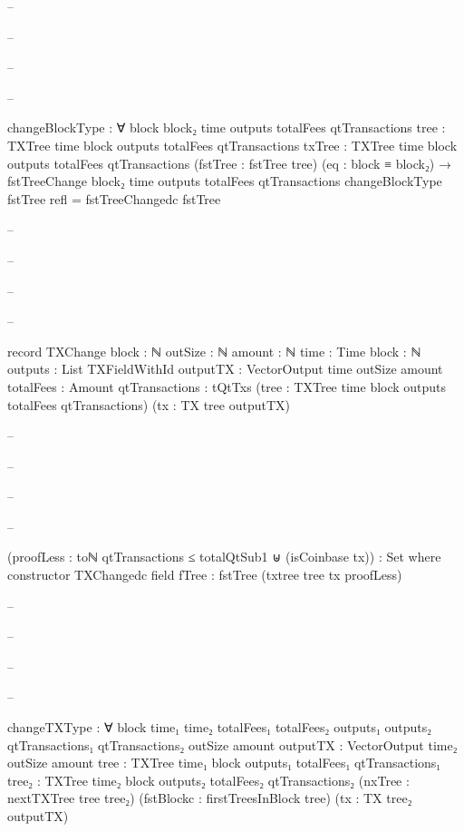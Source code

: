 \documentclass{beamer}
\begin{document}
{\begin{frame}
\begin{code}
-- \end{code}
-- \end{frame}
-- \begin{frame}
-- \begin{code}

      changeBlockType : ∀
        {block block₂ time outputs totalFees qtTransactions}
        {tree : TXTree time block outputs totalFees qtTransactions}
        {txTree : TXTree time block outputs
          totalFees qtTransactions}
        (fstTree : fstTree tree)
        (eq : block ≡ block₂)
        → fstTreeChange block₂ time outputs
          totalFees qtTransactions
      changeBlockType fstTree refl = fstTreeChangedc fstTree

-- \end{code}
-- \end{frame}
-- \begin{frame}
-- \begin{code}

      record TXChange
        {block : ℕ}
        {outSize : ℕ}
        {amount : ℕ}
        {time : Time}
        {block : ℕ}
        {outputs : List TXFieldWithId}
        {outputTX : VectorOutput time outSize amount}
        {totalFees : Amount}
        {qtTransactions : tQtTxs}
        (tree : TXTree time block outputs totalFees qtTransactions)
        (tx : TX tree outputTX)

-- \end{code}
-- \end{frame}
-- \begin{frame}
-- \begin{code}

        (proofLess :
          toℕ qtTransactions ≤ totalQtSub1
          ⊎
          (isCoinbase tx))
        : Set where
        constructor TXChangedc
        field
          fTree                 : fstTree (txtree tree tx proofLess)

-- \end{code}
-- \end{frame}
-- \begin{frame}
-- \begin{code}


      changeTXType : ∀
        {block time₁ time₂ totalFees₁ totalFees₂
          outputs₁ outputs₂ qtTransactions₁ qtTransactions₂
        outSize amount}
        {outputTX : VectorOutput time₂ outSize amount}
        {tree : TXTree time₁ block
          outputs₁ totalFees₁ qtTransactions₁}
        {tree₂ : TXTree time₂ block outputs₂
          totalFees₂ qtTransactions₂}
        (nxTree : nextTXTree tree tree₂)
        (fstBlockc : firstTreesInBlock tree)
        (tx : TX tree₂ outputTX)


\end{code}
\end{frame}}
\end{document}
